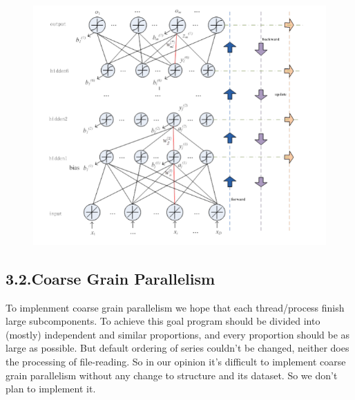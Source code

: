 \documentclass{article}
\begin{document}
\begin{figure}[tbp]%
\begin{mdcenter}%

\noindent{}\includegraphics[keepaspectratio=true,width=\dimmin{}{\dimwidth{0.90}}]{images/2016-02-21-21-15-24-}{}%

\mdhr{}%

\noindent{}%
\end{mdcenter}\label{fig-figure}%
\end{figure}%

\subsection{3.2.\hspace*{0.5em}Coarse Grain Parallelism}\label{sec-coarse-grain-parallelism}%

\noindent{}To implenment coarse grain parallelism we hope that each thread/process finish large subcomponents. To achieve this goal  program should be divided into (mostly) independent and similar proportions, and every proportion should be as large as possible. But default ordering of  series couldn't be changed, neither does the processing of file-reading. So in our opinion it's difficult to implement coarse grain parallelism without any change to  structure and its dataset. So we don't plan to implement it.%
\end{document}
